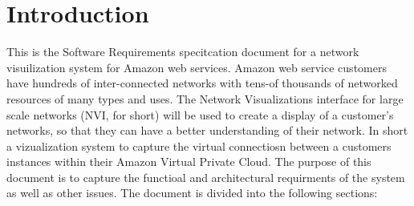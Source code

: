 \documentclass[a4paper,12pt]{report}
\begin{document}
\section{Introduction}
This is the Software Requirements specitcation document for a network visuilization system for Amazon web services. Amazon web service customers have hundreds of inter-connected networks with tens-of thousands of networked resources of many types and uses. The Network Visualizations interface for large scale networks (NVI, for short) will be used to create a display of a customer's networks, so that they can have a better understanding of their network. In short a vizualization system to capture the virtual connectiosn between a customers instances within their Amazon Virtual Private Cloud.
The purpose of this document is to capture the functioal and architectural requirments of the system as well as other issues. The document is divided into the following sections:
\end{document}
